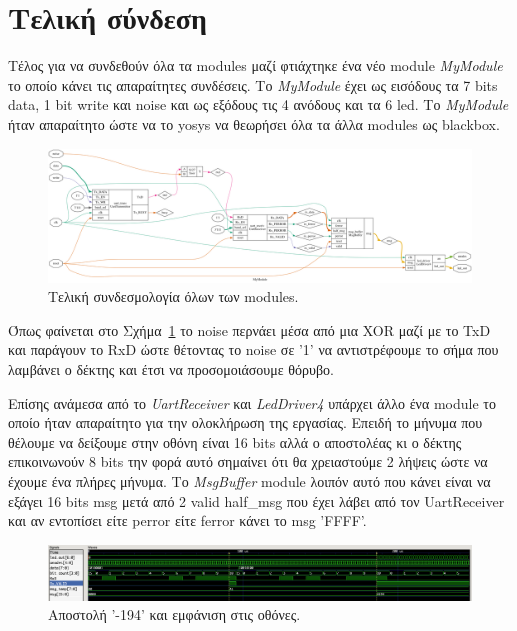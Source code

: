 \documentclass[../main.tex]{subfiles}
\begin{document}
\section{Τελική σύνδεση}
Τέλος για να συνδεθούν όλα τα modules μαζί φτιάχτηκε ένα νέο module
\textit{MyModule} το οποίο κάνει τις απαραίτητες συνδέσεις. Το \textit{MyModule}
έχει ως εισόδους τα 7 bits data, 1 bit write και noise και ως εξόδους τις 4
ανόδους και τα 6 led. Το \textit{MyModule} ήταν απαραίτητο ώστε να το yosys να
θεωρήσει όλα τα άλλα modules ως blackbox.

\begin{figure}[H]
  \begin{center}
    \includegraphics[width=\textwidth]{../../diagrams/MyModule.png}
  \end{center}
  \caption{Τελική συνδεσμολογία όλων των modules.}
  \label{fig:final}
\end{figure}

Όπως φαίνεται στο Σχήμα~\ref{fig:final} το noise περνάει μέσα από μια XOR μαζί
με το TxD και παράγουν το RxD ώστε θέτοντας το noise σε '1' να αντιστρέφουμε το
σήμα που λαμβάνει ο δέκτης και έτσι να προσομοιάσουμε θόρυβο.

Επίσης ανάμεσα από το \textit{UartReceiver} και \textit{LedDriver4} υπάρχει άλλο
ένα module το οποίο ήταν απαραίτητο για την ολοκλήρωση της εργασίας. Επειδή το
μήνυμα που θέλουμε να δείξουμε στην οθόνη είναι 16 bits αλλά ο αποστολέας κι ο
δέκτης επικοινωνούν 8 bits την φορά αυτό σημαίνει ότι θα χρειαστούμε 2 λήψεις
ώστε να έχουμε ένα πλήρες μήνυμα. Το \textit{MsgBuffer} module λοιπόν αυτό που
κάνει είναι να εξάγει 16 bits msg μετά από 2 valid half\_msg που έχει λάβει από
τον UartReceiver και αν εντοπίσει είτε perror είτε ferror κάνει το msg 'FFFF'.

\begin{figure}[H]
  \begin{center}
    \includegraphics[width=\textwidth]{../images/mymodule_tb.png}
  \end{center}
  \caption{Αποστολή '-194' και εμφάνιση στις οθόνες.}
  \label{fig:final_-194}
\end{figure}
\end{document}
